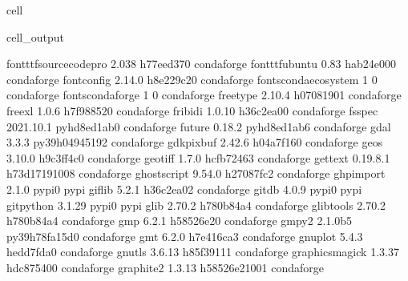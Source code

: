 \documentclass[letterpaper,table,10pt,english]{jupyterBook}
\begin{document}
\begin{sphinxuseclass}{cell}
\begin{sphinxVerbatimOutput}
\begin{sphinxuseclass}{cell_output}
\begin{sphinxVerbatim}[commandchars=\\\{\}]
font\PYGZhy{}ttf\PYGZhy{}source\PYGZhy{}code\PYGZhy{}pro  2.038                h77eed37\PYGZus{}0    conda\PYGZhy{}forge
font\PYGZhy{}ttf\PYGZhy{}ubuntu           0.83                 hab24e00\PYGZus{}0    conda\PYGZhy{}forge
fontconfig                2.14.0               h8e229c2\PYGZus{}0    conda\PYGZhy{}forge
fonts\PYGZhy{}conda\PYGZhy{}ecosystem     1                             0    conda\PYGZhy{}forge
fonts\PYGZhy{}conda\PYGZhy{}forge         1                             0    conda\PYGZhy{}forge
freetype                  2.10.4               h0708190\PYGZus{}1    conda\PYGZhy{}forge
freexl                    1.0.6                h7f98852\PYGZus{}0    conda\PYGZhy{}forge
fribidi                   1.0.10               h36c2ea0\PYGZus{}0    conda\PYGZhy{}forge
fsspec                    2021.10.1          pyhd8ed1ab\PYGZus{}0    conda\PYGZhy{}forge
future                    0.18.2             pyhd8ed1ab\PYGZus{}6    conda\PYGZhy{}forge
gdal                      3.3.3            py39h0494519\PYGZus{}2    conda\PYGZhy{}forge
gdk\PYGZhy{}pixbuf                2.42.6               h04a7f16\PYGZus{}0    conda\PYGZhy{}forge
geos                      3.10.0               h9c3ff4c\PYGZus{}0    conda\PYGZhy{}forge
geotiff                   1.7.0                hcfb7246\PYGZus{}3    conda\PYGZhy{}forge
gettext                   0.19.8.1          h73d1719\PYGZus{}1008    conda\PYGZhy{}forge
ghostscript               9.54.0               h27087fc\PYGZus{}2    conda\PYGZhy{}forge
ghp\PYGZhy{}import                2.1.0                    pypi\PYGZus{}0    pypi
giflib                    5.2.1                h36c2ea0\PYGZus{}2    conda\PYGZhy{}forge
gitdb                     4.0.9                    pypi\PYGZus{}0    pypi
gitpython                 3.1.29                   pypi\PYGZus{}0    pypi
glib                      2.70.2               h780b84a\PYGZus{}4    conda\PYGZhy{}forge
glib\PYGZhy{}tools                2.70.2               h780b84a\PYGZus{}4    conda\PYGZhy{}forge
gmp                       6.2.1                h58526e2\PYGZus{}0    conda\PYGZhy{}forge
gmpy2                     2.1.0b5          py39h78fa15d\PYGZus{}0    conda\PYGZhy{}forge
gmt                       6.2.0                h7e416ca\PYGZus{}3    conda\PYGZhy{}forge
gnuplot                   5.4.3                hedd7fda\PYGZus{}0    conda\PYGZhy{}forge
gnutls                    3.6.13               h85f3911\PYGZus{}1    conda\PYGZhy{}forge
graphicsmagick            1.3.37               hdc87540\PYGZus{}0    conda\PYGZhy{}forge
graphite2                 1.3.13            h58526e2\PYGZus{}1001    conda\PYGZhy{}forge

\end{sphinxVerbatim}
\end{sphinxuseclass}
\end{sphinxVerbatimOutput}
\end{sphinxuseclass}
\end{document}
